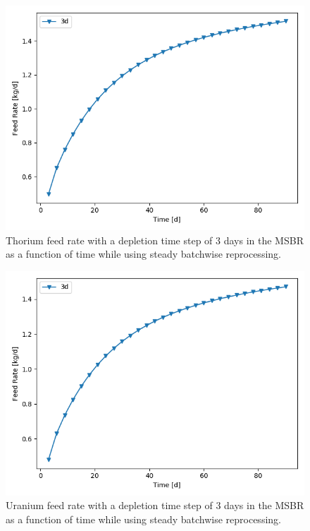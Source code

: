 \begin{figure}[H]
  \centering
  \includegraphics[scale=0.75]{images/feed_Th232_3d_90d.png}
  \caption{Thorium feed rate with a depletion time step of 3 days in the MSBR as a function of time while using steady batchwise reprocessing.}
   \label{fig:Th-feed-v3}
\end{figure}

\begin{figure}[H]
  \centering
  \includegraphics[scale=0.75]{images/feed_U233_3d_90d.png}
  \caption{Uranium feed rate with a depletion time step of 3 days in the MSBR as a function of time while using steady batchwise reprocessing.}
   \label{fig:U-feed-v3}
\end{figure}


